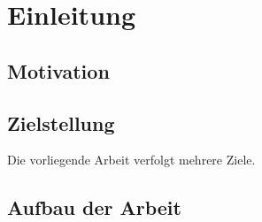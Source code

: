 \chapter{Einleitung}\label{sec:chapter1}


\section{Motivation}



\section{Zielstellung}

Die vorliegende Arbeit verfolgt mehrere Ziele.

\section{Aufbau der Arbeit}

